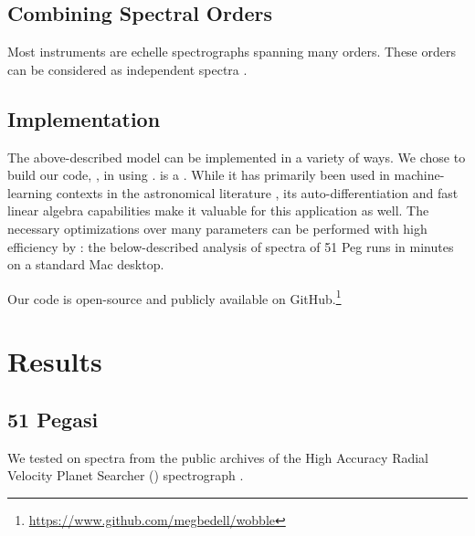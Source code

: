 \documentclass[modern]{aastex62}
\begin{document}
\subsection{Combining Spectral Orders}

Most \EPRV instruments are echelle spectrographs spanning many orders. 
These orders can be considered as independent spectra . 

\subsection{Implementation}

The above-described model can be implemented in a variety of ways. We chose to build our code, \wobble, in  using \TF. 
\TF is a . 
While it has primarily been used in machine-learning contexts in the astronomical literature , its auto-differentiation and fast linear algebra capabilities make it valuable for this application as well. 
The necessary optimizations over many parameters can be performed with high efficiency by \TF: the below-described analysis of  spectra of 51 Peg runs in  minutes on a standard Mac desktop.


Our code is open-source and publicly available on GitHub.\footnote{\url{https://www.github.com/megbedell/wobble}}



\section{Results}
\label{s:results}
\subsection{51 Pegasi}

We tested \wobble on spectra from the public archives of the High Accuracy Radial Velocity Planet Searcher (\HARPS) spectrograph \citep{Mayor2003}. 



\end{document}

